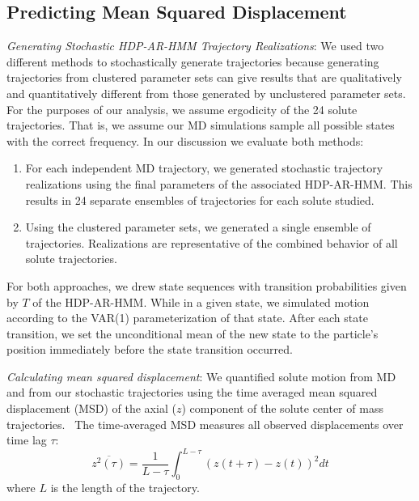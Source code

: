 \documentclass[journal=jpcbfk,manuscript=article]{achemso}
\begin{document}
  
  \subsection{Predicting Mean Squared Displacement}\label{method:realizations}

  \textit{Generating Stochastic HDP-AR-HMM Trajectory Realizations}: We used two 
  different methods to stochastically generate trajectories because generating
  trajectories from clustered parameter sets can give results that are qualitatively 
  and quantitatively different from those generated by unclustered parameter sets.
  For the purposes of our analysis, we assume ergodicity of the 24 solute trajectories.
  That is, we assume our MD simulations sample all possible states with the correct 
  frequency.
  In our discussion we evaluate both methods:
  \begin{enumerate}[label={Method \theenumi :}, leftmargin=3.5\parindent]
    \item For each independent MD trajectory, we generated stochastic trajectory
    realizations using the final parameters of the associated HDP-AR-HMM. This 
    results in 24 separate ensembles of trajectories for each solute studied.
    \item Using the clustered parameter sets, we generated a single ensemble
	of trajectories. Realizations are representative of the combined behavior
	of all solute trajectories.
  \end{enumerate}
  
  For both approaches, we drew state sequences with transition probabilities given 
  by $T$ of the HDP-AR-HMM. While in a given state, we simulated motion according to the 
  VAR(1) parameterization of that state. After each state transition, we set the 
  unconditional mean of the new state to the particle's position immediately before
  the state transition occurred.
  
  \textit{Calculating mean squared displacement}: We quantified solute motion from
  MD and from our stochastic trajectories using the time averaged mean squared 
  displacement (MSD) of the axial ($z$) component of the solute center of mass
  trajectories.~\cite{meroz_toolbox_2015} The time-averaged MSD measures all observed 
  displacements over time lag $\tau$:
  \begin{equation}
  	\overline{z^2(\tau)} = \dfrac{1}{L - \tau}\int_{0}^{L - \tau} (z(t + \tau) - z(t))^2 dt
  \label{eqn:tamsd}
  \end{equation}
  where $L$ is the length of the trajectory. 
  
\end{document}
